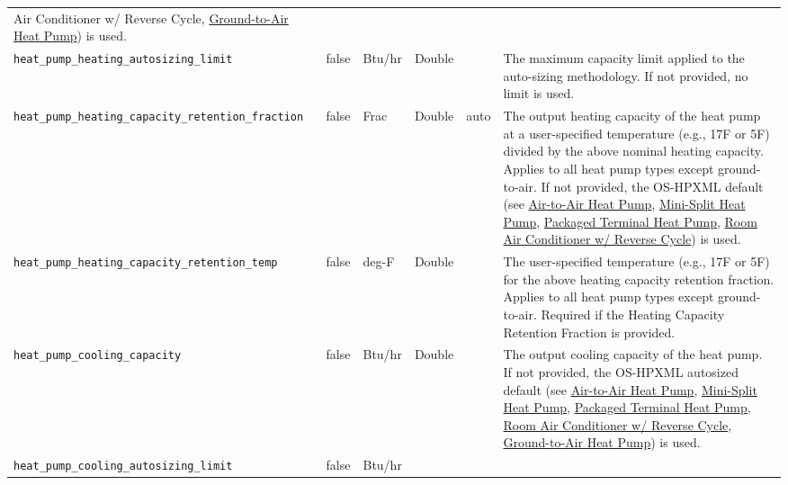 \begin{longtable}[]{@{}llllll@{}}
{Air Conditioner w/ Reverse Cycle},
\href{https://openstudio-hpxml.readthedocs.io/en/v1.7.0/workflow_inputs.html\#ground-to-air-heat-pump}{Ground-to-Air
Heat Pump}) is used. \\
\texttt{heat\_pump\_heating\_autosizing\_limit} & false & Btu/hr &
Double & & The maximum capacity limit applied to the auto-sizing
methodology. If not provided, no limit is used. \\
\texttt{heat\_pump\_heating\_capacity\_retention\_fraction} & false &
Frac & Double & auto & The output heating capacity of the heat pump at a
user-specified temperature (e.g., 17F or 5F) divided by the above
nominal heating capacity. Applies to all heat pump types except
ground-to-air. If not provided, the OS-HPXML default (see
\href{https://openstudio-hpxml.readthedocs.io/en/v1.7.0/workflow_inputs.html\#air-to-air-heat-pump}{Air-to-Air
Heat Pump},
\href{https://openstudio-hpxml.readthedocs.io/en/v1.7.0/workflow_inputs.html\#mini-split-heat-pump}{Mini-Split
Heat Pump},
\href{https://openstudio-hpxml.readthedocs.io/en/v1.7.0/workflow_inputs.html\#packaged-terminal-heat-pump}{Packaged
Terminal Heat Pump},
\href{https://openstudio-hpxml.readthedocs.io/en/v1.7.0/workflow_inputs.html\#room-air-conditioner-w-reverse-cycle}{Room
Air Conditioner w/ Reverse Cycle}) is used. \\
\texttt{heat\_pump\_heating\_capacity\_retention\_temp} & false & deg-F
& Double & & The user-specified temperature (e.g., 17F or 5F) for the
above heating capacity retention fraction. Applies to all heat pump
types except ground-to-air. Required if the Heating Capacity Retention
Fraction is provided. \\
\texttt{heat\_pump\_cooling\_capacity} & false & Btu/hr & Double & & The
output cooling capacity of the heat pump. If not provided, the OS-HPXML
autosized default (see
\href{https://openstudio-hpxml.readthedocs.io/en/v1.7.0/workflow_inputs.html\#air-to-air-heat-pump}{Air-to-Air
Heat Pump},
\href{https://openstudio-hpxml.readthedocs.io/en/v1.7.0/workflow_inputs.html\#mini-split-heat-pump}{Mini-Split
Heat Pump},
\href{https://openstudio-hpxml.readthedocs.io/en/v1.7.0/workflow_inputs.html\#packaged-terminal-heat-pump}{Packaged
Terminal Heat Pump},
\href{https://openstudio-hpxml.readthedocs.io/en/v1.7.0/workflow_inputs.html\#room-air-conditioner-w-reverse-cycle}{Room
Air Conditioner w/ Reverse Cycle},
\href{https://openstudio-hpxml.readthedocs.io/en/v1.7.0/workflow_inputs.html\#ground-to-air-heat-pump}{Ground-to-Air
Heat Pump}) is used. \\
\texttt{heat\_pump\_cooling\_autosizing\_limit} & false & Btu/hr &

\end{longtable}
